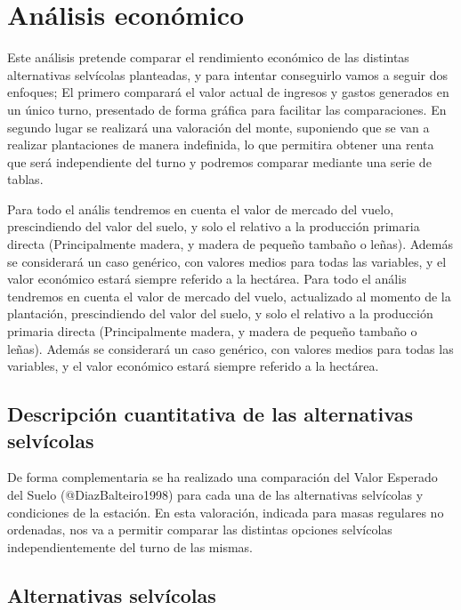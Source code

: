 \documentclass[
]{article}
\begin{document}
\hypertarget{anuxe1lisis-econuxf3mico}{%
\section{Análisis económico}\label{anuxe1lisis-econuxf3mico}}

Este análisis pretende comparar el rendimiento económico de las
distintas alternativas selvícolas planteadas, y para intentar
conseguirlo vamos a seguir dos enfoques; El primero comparará el valor
actual de ingresos y gastos generados en un único turno, presentado de
forma gráfica para facilitar las comparaciones. En segundo lugar se
realizará una valoración del monte, suponiendo que se van a realizar
plantaciones de manera indefinida, lo que permitira obtener una renta
que será independiente del turno y podremos comparar mediante una serie
de tablas.

Para todo el anális tendremos en cuenta el valor de mercado del vuelo,
prescindiendo del valor del suelo, y solo el relativo a la producción
primaria directa (Principalmente madera, y madera de pequeño tambaño o
leñas). Además se considerará un caso genérico, con valores medios para
todas las variables, y el valor económico estará siempre referido a la
hectárea. Para todo el anális tendremos en cuenta el valor de mercado
del vuelo, actualizado al momento de la plantación, prescindiendo del
valor del suelo, y solo el relativo a la producción primaria directa
(Principalmente madera, y madera de pequeño tambaño o leñas). Además se
considerará un caso genérico, con valores medios para todas las
variables, y el valor económico estará siempre referido a la hectárea.

\hypertarget{descripciuxf3n-cuantitativa-de-las-alternativas-selvuxedcolas}{%
\subsection{Descripción cuantitativa de las alternativas
selvícolas}\label{descripciuxf3n-cuantitativa-de-las-alternativas-selvuxedcolas}}

De forma complementaria se ha realizado una comparación del Valor
Esperado del Suelo (@DiazBalteiro1998) para cada una de las alternativas
selvícolas y condiciones de la estación. En esta valoración, indicada
para masas regulares no ordenadas, nos va a permitir comparar las
distintas opciones selvícolas independientemente del turno de las
mismas.

\hypertarget{alternativas-selvuxedcolas-1}{%
\subsection{Alternativas
selvícolas}\label{alternativas-selvuxedcolas-1}}
\end{document}
